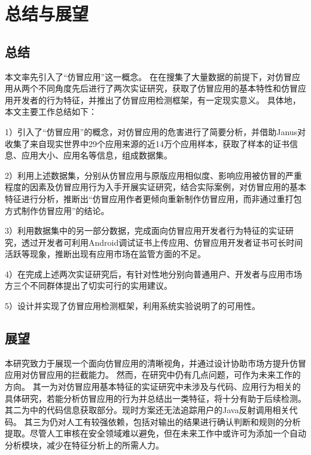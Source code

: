 \chapter{总结与展望}
\label{chp:future}

\section{总结}
本文率先引入了``仿冒应用''这一概念。
在在搜集了大量数据的前提下，对仿冒应用从两个不同角度先后进行了两次实证研究，获取了仿冒应用的基本特性和仿冒应用开发者的行为特征，并推出了仿冒应用检测框架\mytool ，有一定现实意义。
具体地，本文主要工作总结如下：

1）引入了``仿冒应用''的概念，对仿冒应用的危害进行了简要分析，并借助Janus对收集了来自现实世界中29个应用来源的近14万个应用样本，获取了样本的证书信息、应用大小、应用名等信息，组成数据集。

2）利用上述数据集，分别从仿冒应用与原版应用相似度、影响应用被仿冒的严重程度的因素及仿冒应用行为入手开展实证研究，结合实际案例，对仿冒应用的基本特征进行分析，推断出``仿冒应用作者更倾向重新制作仿冒应用，而非通过重打包方式制作仿冒应用''的结论。

3）利用数据集中的另一部分数据，完成面向仿冒应用开发者行为特征的实证研究，透过开发者可利用Android调试证书上传应用、仿冒应用开发者证书可长时间活跃等现象，推断出现有应用市场在监管方面的不足。

4）在完成上述两次实证研究后，有针对性地分别向普通用户、开发者与应用市场方三个不同群体提出了切实可行的实用建议。

5）设计并实现了仿冒应用检测框架\mytool ，利用系统实验说明了\mytool 的可用性。


\section{展望}

本研究致力于展现一个面向仿冒应用的清晰视角，并通过设计\mytool 协助市场方提升仿冒应用对仿冒应用的拦截能力。
然而，在研究中仍有几点问题，可作为未来工作的方向。
其一为对仿冒应用基本特征的实证研究中未涉及与代码、应用行为相关的具体研究，若能分析仿冒应用的行为并总结出一类特征，将十分有助于后续检测。
其二为\mytool 中\componentB 的代码信息获取部分。现时方案还无法追踪用户的Java反射调用相关代码。
其三为\mytool 仍对人工有较强依赖，包括对输出的结果进行确认判断和规则的分析提取。尽管人工审核在安全领域难以避免，但在未来工作中或许可为\mytool 添加一个自动分析模块，减少在特征分析上的所需人力。
